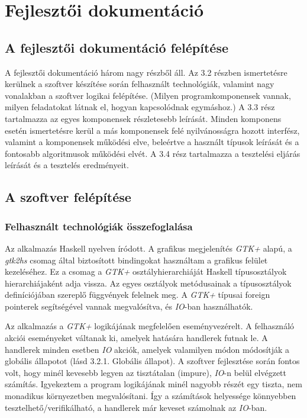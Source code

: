 \chapter{Fejlesztői dokumentáció} %
\label{ch:impl}

\section{A fejlesztői dokumentáció felépítése}

A fejlesztői dokumentáció három nagy részből áll. Az 3.2 részben ismertetésre kerülnek a szoftver készítése során felhasznált technológiák, valamint nagy vonalakban a szoftver logikai felépítése. (Milyen programkomponensek vannak, milyen feladatokat látnak el, hogyan kapcsolódnak egymáshoz.) A 3.3 rész tartalmazza az egyes komponensek részletesebb leírását. Minden komponens esetén ismertetésre kerül a más komponensek felé nyilvánosságra hozott interfész, valamint a komponensek működési elve, beleértve a használt típusok leírását és a fontosabb algoritmusok működési elvét. A 3.4 rész tartalmazza a tesztelési eljárás leírását és a tesztelés eredményeit. 

\section{A szoftver felépítése}

\subsection{Felhasznált technológiák összefoglalása}

Az alkalmazás Haskell nyelven íródott. A grafikus megjelenítés \textit{GTK+} alapú, a \textit{gtk2hs} csomag által biztosított bindingokat használtam a grafikus felület kezeléséhez. Ez a csomag a \textit{GTK+} osztályhierarchiáját Haskell típusosztályok hierarchiájaként adja vissza. Az egyes osztályok metódusainak a típusosztályok definíciójában szereplő függvények felelnek meg. A \textit{GTK+} típusai foreign pointerek segítségével vannak megvalósítva, és \textit{IO}-ban használhatók. 

Az alkalmazás a \textit{GTK+} logikájának megfelelően eseményvezérelt. A felhasználó akciói eseményeket váltanak ki, amelyek hatására handlerek futnak le. A handlerek minden esetben \textit{IO} akciók, amelyek valamilyen módon módosítják a globális állapotot (lásd 3.2.1. Globális állapot). A szoftver fejlesztése során fontos volt, hogy minél kevesebb legyen az tisztátalan (impure), \textit{IO}-n belül elvégzett számítás. Igyekeztem a program logikájának minél nagyobb részét egy tiszta, nem monadikus környezetben megvalósítani. Így a számítások helyessége könnyebben tesztelhető/verifikálható, a handlerek már keveset számolnak az \textit{IO}-ban.

